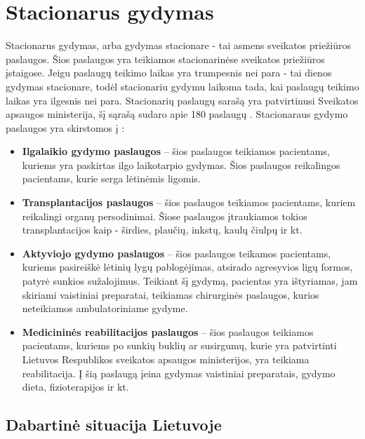 \section{Stacionarus gydymas}

Stacionarus gydymas, arba gydymas stacionare - tai asmens sveikatos priežiūros paslaugos. Šios paslaugos yra teikiamos stacionarinėse sveikatos priežiūros įstaigose. Jeigu paslaugų teikimo laikas yra trumpesnis nei para - tai dienos gydymas stacionare, todėl stacionariu gydymu laikoma tada, kai paslaugų teikimo laikas yra ilgesnis nei para. Stacionarių paslaugų sarašą yra patvirtinusi Sveikatos apsaugos ministerija, šį sąrašą sudaro apie 180 paslaugų \cite{StacionaroPaslaugos}. Stacionaraus gydymo paslaugos yra skirstomos į \cite{LigoniuKasa}: 
\begin{itemize}
    \item \textbf{Ilgalaikio gydymo paslaugos} – šios paslaugos teikiamos pacientams, kuriems yra paskirtas ilgo laikotarpio gydymas. Šios paslaugos reikalingos pacientams, kurie serga lėtinėmis ligomis.
    \item \textbf{Transplantacijos paslaugos} – šios paslaugos teikiamos pacientams, kuriem reikalingi organų persodinimai. Šiose paslaugos įtraukiamos tokios transplantacijos kaip - širdies, plaučių, inkstų, kaulų čiulpų ir kt. 
    \item \textbf{Aktyviojo gydymo paslaugos} – šios paslaugos teikamos pacientams, kuriems pasireiškė lėtinių lygų pablogėjimas, atsirado agresyvios ligų formos, patyrė sunkios sužalojimus. Teikiant šį gydymą, pacientas yra ištyriamas, jam skiriami vaistiniai preparatai, teikiamas chirurginės paslaugos, kurios neteikiamos ambulatoriniame gydyme.
    \item \textbf{Medicininės reabilitacijos paslaugos} – šios paslaugos teikiamos pacientams, kuriems po sunkių buklių ar susirgumų, kurie yra patvirtinti Lietuvos Respublikos sveikatos apsaugos ministerijos, yra teikiama reabilitacija. Į šią paslaugą įeina gydymas vaistiniai preparatais, gydymo dieta, fizioterapijos ir kt.
\end{itemize}

\subsection{Dabartinė situacija Lietuvoje}

